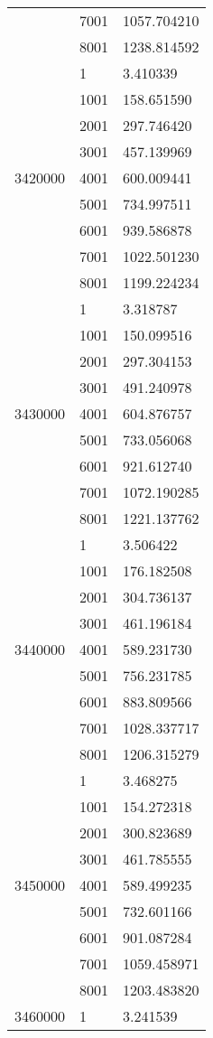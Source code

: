 \begin{table}[htb!]
\begin{tabular}{lll}
 & 7001 & 1057.704210 \\
 & 8001 & 1238.814592 \\
\multirow[c]{9}{*}{3420000} & 1 & 3.410339 \\
 & 1001 & 158.651590 \\
 & 2001 & 297.746420 \\
 & 3001 & 457.139969 \\
 & 4001 & 600.009441 \\
 & 5001 & 734.997511 \\
 & 6001 & 939.586878 \\
 & 7001 & 1022.501230 \\
 & 8001 & 1199.224234 \\
\multirow[c]{9}{*}{3430000} & 1 & 3.318787 \\
 & 1001 & 150.099516 \\
 & 2001 & 297.304153 \\
 & 3001 & 491.240978 \\
 & 4001 & 604.876757 \\
 & 5001 & 733.056068 \\
 & 6001 & 921.612740 \\
 & 7001 & 1072.190285 \\
 & 8001 & 1221.137762 \\
\multirow[c]{9}{*}{3440000} & 1 & 3.506422 \\
 & 1001 & 176.182508 \\
 & 2001 & 304.736137 \\
 & 3001 & 461.196184 \\
 & 4001 & 589.231730 \\
 & 5001 & 756.231785 \\
 & 6001 & 883.809566 \\
 & 7001 & 1028.337717 \\
 & 8001 & 1206.315279 \\
\multirow[c]{9}{*}{3450000} & 1 & 3.468275 \\
 & 1001 & 154.272318 \\
 & 2001 & 300.823689 \\
 & 3001 & 461.785555 \\
 & 4001 & 589.499235 \\
 & 5001 & 732.601166 \\
 & 6001 & 901.087284 \\
 & 7001 & 1059.458971 \\
 & 8001 & 1203.483820 \\
\multirow[c]{9}{*}{3460000} & 1 & 3.241539 \\

\end{tabular}
\end{table}
